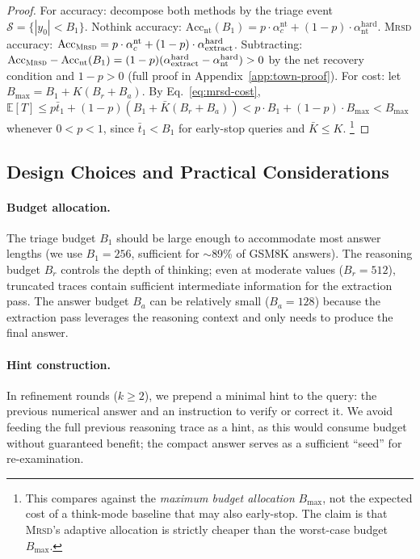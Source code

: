 \begin{proof}
For accuracy: decompose both methods by the triage event
$\mathcal{S} = \{|y_0| < B_1\}$.
Nothink accuracy: $\mathrm{Acc}_{\mathrm{nt}}(B_1) = p \cdot \alpha_c^{\mathrm{nt}}
+ (1-p) \cdot \alpha_{\mathrm{nt}}^{\mathrm{hard}}$.
\textsc{Mrsd} accuracy:
$\mathrm{Acc}_{\textsc{Mrsd}} = p \cdot \alpha_c^{\mathrm{nt}}
+ (1-p) \cdot \alpha_{\mathrm{extract}}^{\mathrm{hard}}$.
Subtracting: $\mathrm{Acc}_{\textsc{Mrsd}} - \mathrm{Acc}_{\mathrm{nt}}(B_1)
= (1-p)(\alpha_{\mathrm{extract}}^{\mathrm{hard}} - \alpha_{\mathrm{nt}}^{\mathrm{hard}}) > 0$
by the net recovery condition and $1 - p > 0$
(full proof in Appendix~\ref{app:town-proof}).
For cost: let $B_{\max} = B_1 + K(B_r + B_a)$.
By Eq.~\eqref{eq:mrsd-cost},
$\mathbb{E}[T] \le p \bar{t}_1 + (1-p)(B_1 + \bar{K}(B_r + B_a))
< p \cdot B_1 + (1-p) \cdot B_{\max} < B_{\max}$
whenever $0 < p < 1$, since $\bar{t}_1 < B_1$
for early-stop queries and $\bar{K} \le K$.%
\footnote{This compares against the \emph{maximum budget allocation}
$B_{\max}$, not the expected cost of a think-mode baseline that may
also early-stop.
The claim is that \textsc{Mrsd}'s adaptive allocation is strictly
cheaper than the worst-case budget $B_{\max}$.}
\end{proof}

\subsection{Design Choices and Practical Considerations}
\label{sec:method:design}

\paragraph{Budget allocation.}
The triage budget $B_1$ should be large enough to accommodate most
answer lengths (we use $B_1{=}256$, sufficient for ${\sim}$89\% of
GSM8K answers).
The reasoning budget $B_r$ controls the depth of thinking; even at
moderate values ($B_r{=}512$), truncated traces contain sufficient
intermediate information for the extraction pass.
The answer budget $B_a$ can be relatively small ($B_a{=}128$) because
the extraction pass leverages the reasoning context and only needs
to produce the final answer.

\paragraph{Hint construction.}
In refinement rounds ($k \ge 2$), we prepend a minimal hint to the
query: the previous numerical answer and an instruction to verify or
correct it.
We avoid feeding the full previous reasoning trace as a hint, as this
would consume budget without guaranteed benefit; the compact answer
serves as a sufficient ``seed'' for re-examination.

